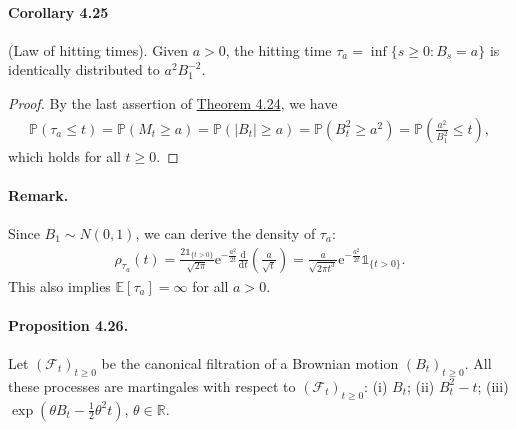 \documentclass{article}
\numberwithin{equation}{section}
\newcommand{\e}{\mathrm{e}}
\newcommand{\E}{\mathbb{E}}
\renewcommand{\P}{\mathbb{P}}
\renewcommand{\d}{\mathrm{d}}
\theoremstyle{plain}
\theoremstyle{definition}
\begin{document}
\paragraph{Corollary 4.25\label{cor:4.25}} (Law of hitting times). Given $a>0$, the hitting time $\tau_a=\inf\{s\geq 0:B_s=a\}$ is identically distributed to $a^2B_1^{-2}$.
\begin{proof}
By the last assertion of \hyperref[thm:4.24]{Theorem 4.24}, we have
\begin{align*}
	\P\left(\tau_a\leq t\right)=\P\left(M_t\geq a\right) = \P\left(\vert B_t\vert\geq a\right) = \P(B_t^2\geq a^2) = \P\left(\frac{a^2}{B_1^2}\leq t\right),
\end{align*}
which holds for all $t\geq 0$.
\end{proof}
\paragraph{Remark.} Since $B_1\sim N(0,1)$, we can derive the density of $\tau_a$:
\begin{align*}
	\rho_{\tau_a}(t)=\frac{2\mathds{1}_{\{t> 0\}}}{\sqrt{2\pi}}\e^{-\frac{a^2}{2t}}\frac{\d}{\d t}\left(\frac{a}{\sqrt{t}}\right) = \frac{a}{\sqrt{2\pi t^3}}\e^{-\frac{a^2}{2t}}\mathds{1}_{\{t>0\}}.
\end{align*}
This also implies $\E[\tau_a]= \infty$ for all $a>0$.

\paragraph{Proposition 4.26.\label{prop:4.26}} Let $(\mathscr{F}_t)_{t\geq 0}$ be the canonical filtration of a Brownian motion $(B_t)_{t\geq 0}$. All these processes are martingales with respect to $(\mathscr{F}_t)_{t\geq 0}$: (i) $B_t$; (ii) $B_t^2-t$; (iii) $\exp(\theta B_t-\frac{1}{2}\theta^2t)$, $\theta\in\mathbb{R}$.
\end{document}
